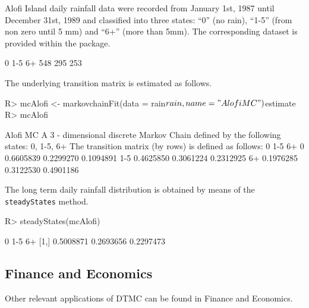 \documentclass[
  nojss]{jss}
\begin{document}
Alofi Island daily rainfall
data were recorded from January 1st, 1987 until December 31st, 1989 and
classified into three states: ``0'' (no rain), ``1-5'' (from non zero until 5 mm) and ``6+'' (more than 5mm). The corresponding dataset is provided within the  package.

\begin{CodeChunk}
\begin{CodeOutput}

  0 1-5  6+ 
548 295 253 
\end{CodeOutput}
\end{CodeChunk}

The underlying transition matrix is estimated as follows.

\begin{CodeChunk}
\begin{CodeInput}
R> mcAlofi <- markovchainFit(data = rain$rain, name = "Alofi MC")$estimate
R> mcAlofi
\end{CodeInput}
\begin{CodeOutput}
Alofi MC 
 A  3 - dimensional discrete Markov Chain defined by the following states: 
 0, 1-5, 6+ 
 The transition matrix  (by rows)  is defined as follows: 
            0       1-5        6+
0   0.6605839 0.2299270 0.1094891
1-5 0.4625850 0.3061224 0.2312925
6+  0.1976285 0.3122530 0.4901186
\end{CodeOutput}
\end{CodeChunk}

The long term daily rainfall distribution is obtained by means of the \texttt{steadyStates} method.

\begin{CodeChunk}
\begin{CodeInput}
R> steadyStates(mcAlofi)
\end{CodeInput}
\begin{CodeOutput}
             0       1-5        6+
[1,] 0.5008871 0.2693656 0.2297473
\end{CodeOutput}
\end{CodeChunk}

\subsection{Finance and Economics}\label{app:fin}

Other relevant applications of DTMC can be found in Finance and Economics.
\end{document}
